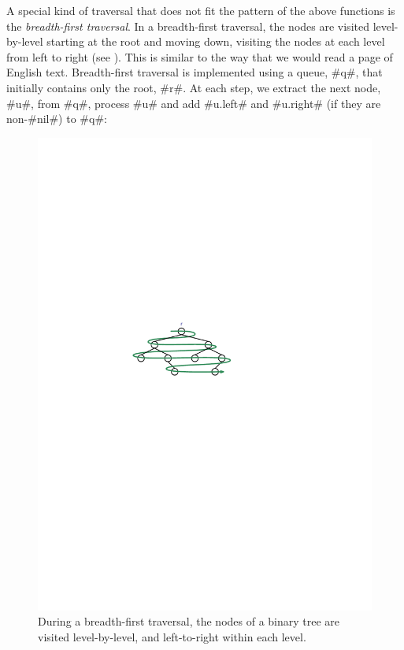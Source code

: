 A special kind of traversal that does not fit the pattern of the above
functions is the \emph{breadth-first traversal}.
%
%
In a breadth-first
traversal, the nodes are visited level-by-level starting at the root and
moving down, visiting the nodes at each level from left to right (see
). This is similar to the way that we would read a
page of English text.   Breadth-first traversal is implemented using a
queue, #q#, that initially contains only the root, #r#.  At each step,
we extract the next node, #u#, from #q#, process #u# and add #u.left#
and #u.right# (if they are non-#nil#) to #q#:

\begin{figure}
  \begin{center}
    \includegraphics[scale=0.90909]{figs/bintree-4}
  \end{center}
  \caption{During a breadth-first traversal, the nodes of a binary tree
  are visited
level-by-level, and left-to-right within each level.}
\end{figure}





